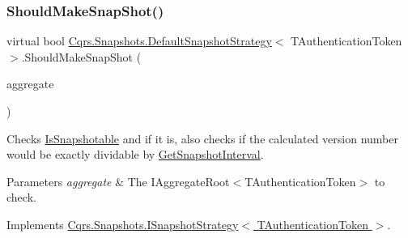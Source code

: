 \subsubsection{\texorpdfstring{Should\+Make\+Snap\+Shot()}{ShouldMakeSnapShot()}}
{\footnotesize\ttfamily virtual bool \hyperlink{classCqrs_1_1Snapshots_1_1DefaultSnapshotStrategy}{Cqrs.\+Snapshots.\+Default\+Snapshot\+Strategy}$<$ T\+Authentication\+Token $>$.Should\+Make\+Snap\+Shot (\begin{DoxyParamCaption}\item[{\hyperlink{interfaceCqrs_1_1Domain_1_1IAggregateRoot}{I\+Aggregate\+Root}$<$ T\+Authentication\+Token $>$}]{aggregate }\end{DoxyParamCaption})\hspace{0.3cm}{\ttfamily [virtual]}}



Checks \hyperlink{classCqrs_1_1Snapshots_1_1DefaultSnapshotStrategy_acdbb918ac01b526aedb5fa9a3879887a_acdbb918ac01b526aedb5fa9a3879887a}{Is\+Snapshotable} and if it is, also checks if the calculated version number would be exactly dividable by \hyperlink{classCqrs_1_1Snapshots_1_1DefaultSnapshotStrategy_a3540a6d621d8c23816da761f929d83a7_a3540a6d621d8c23816da761f929d83a7}{Get\+Snapshot\+Interval}. 


\begin{DoxyParams}{Parameters}
{\em aggregate} & The I\+Aggregate\+Root$<$\+T\+Authentication\+Token$>$ to check.\\
\hline
\end{DoxyParams}


Implements \hyperlink{interfaceCqrs_1_1Snapshots_1_1ISnapshotStrategy_ab1d54cd76c7ac832329cb3a6de0effcd_ab1d54cd76c7ac832329cb3a6de0effcd}{Cqrs.\+Snapshots.\+I\+Snapshot\+Strategy$<$ T\+Authentication\+Token $>$}.

